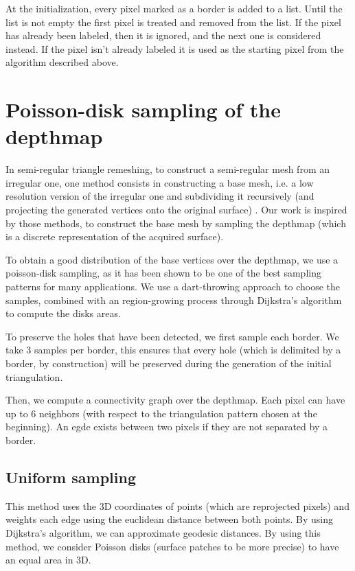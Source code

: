 \documentclass[11pt,fleqn]{book} %
\begin{document}
At the initialization, every pixel marked as a border is added to a list. Until the list is not empty the first pixel is treated and removed from the list. If the pixel has already been labeled, then it is ignored, and the next one is considered instead. If the pixel isn't already labeled it is used as the starting pixel from the algorithm described above.

\section{Poisson-disk sampling of the depthmap}
\label{sec:poisson_sampling}

In semi-regular triangle remeshing, to construct a semi-regular mesh from an irregular one, one method consists in constructing a base mesh, i.e. a low resolution version of the irregular one and subdividing it recursively (and projecting the generated vertices onto the original surface) \cite{PRS15}. Our work is inspired by those methods, to construct the base mesh by sampling the depthmap (which is a discrete representation of the acquired surface).

To obtain a good distribution of the base vertices over the depthmap, we use a poisson-disk sampling, as it has been shown to be one of the best sampling patterns for many applications. 
We use a dart-throwing approach to choose the samples, combined with an region-growing process through Dijkstra's algorithm \cite{Dij59} to compute the disks areas.

To preserve the holes that have been detected, we first sample each border. We take 3 samples per border, this ensures that every hole (which is delimited by a border, by construction) will be preserved during the generation of the initial triangulation.

Then, we compute a connectivity graph over the depthmap. Each pixel can have up to 6 neighbors (with respect to the triangulation pattern chosen at the beginning).
An egde exists between two pixels if they are not separated by a border.

\subsection{Uniform sampling}
This method uses the 3D coordinates of points (which are reprojected pixels) and weights each edge using the euclidean distance between both points.
By using Dijkstra's algorithm, we can approximate geodesic distances. 
By using this method, we consider Poisson disks (surface patches to be more precise) to have an equal area in 3D.
\end{document}
